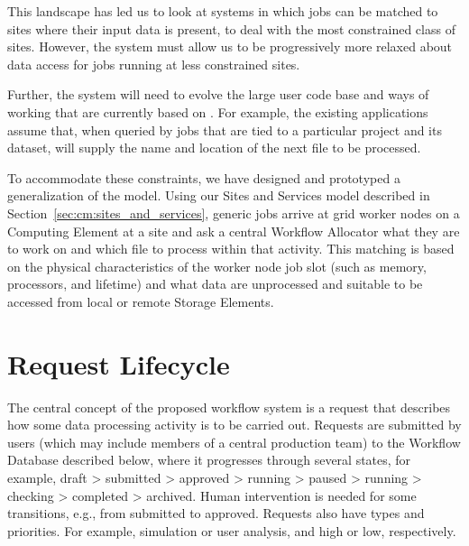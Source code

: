 \documentclass[../main-v1.tex]{subfiles}
\begin{document}
This landscape has led us to look at %
systems in which jobs can be matched to sites where their input data is present, to deal with the most constrained class of sites. %
However, the system must allow us to be progressively more relaxed about data access for jobs running at %
less constrained sites. %
 

Further, the system will need to evolve the large user code base and ways of working that are currently based on . For example, the %
existing applications assume that, when queried by jobs that are tied to a particular  project and its dataset,  will supply the name and location of the next file to be processed. 

To accommodate %
these constraints, we have designed and prototyped a generalization of the  model. Using our Sites and Services model described in Section~\ref{sec:cm:sites_and_services}, generic jobs arrive at grid worker nodes on a Computing Element at a site and ask a central Workflow Allocator what they are to work on and which file to process within that activity. This matching is based on the physical characteristics of the worker node job slot (such as memory, processors, and lifetime) and what data are unprocessed and suitable to be accessed from local or remote Storage Elements. 


\section{Request Lifecycle}
\label{sec:flow:lifecycle}

The central concept of the proposed workflow system is a request %
that describes how some data processing activity is to be carried out. Requests are submitted by users (which may include members of a central production team) to the Workflow Database described below, where it progresses through %
several states, %
for example, draft > submitted > approved > running > paused > running > checking > completed > archived. Human intervention is needed for some transitions, e.g., from submitted to approved. Requests also have types and priorities. For example, simulation or user analysis, and high or low, respectively.
\end{document}
